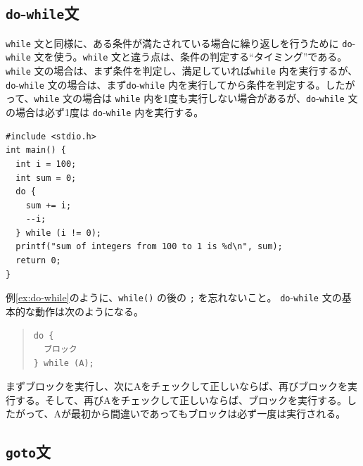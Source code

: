 \subsection{{\tt do}-{\tt while}文}

\verb|while| 文と同様に、ある条件が満たされている場合に繰り返しを行うために \verb|do|-\verb|while| 文を使う。\verb|while| 文と違う点は、条件の判定する``タイミング''である。\verb|while| 文の場合は、まず条件を判定し、満足していれば\verb|while| 内を実行するが、\verb|do|-\verb|while| 文の場合は、まず\verb|do|-\verb|while| 内を実行してから条件を判定する。したがって、\verb|while| 文の場合は \verb|while| 内を1度も実行しない場合があるが、\verb|do|-\verb|while| 文の場合は必ず1度は \verb|do|-\verb|while| 内を実行する。
\begin{reidai}\label{ex:do-while}
\begin{verbatim}
#include <stdio.h>
int main() {
  int i = 100;
  int sum = 0;
  do {
    sum += i;
    --i;
  } while (i != 0);
  printf("sum of integers from 100 to 1 is %d\n", sum);
  return 0;
}
\end{verbatim}
\end{reidai} \noindent
例\ref{ex:do-while}のように、\verb|while()| の後の \verb|;| を忘れないこと。
\verb|do|-\verb|while| 文の基本的な動作は次のようになる。
\begin{quote}
\begin{verbatim}
do {
  ブロック
} while (A);
\end{verbatim}
\end{quote}
まずブロックを実行し、次にAをチェックして正しいならば、再びブロックを実行する。そして、再びAをチェックして正しいならば、ブロックを実行する。したがって、Aが最初から間違いであってもブロックは必ず一度は実行される。

\subsection{{\tt goto}文}

